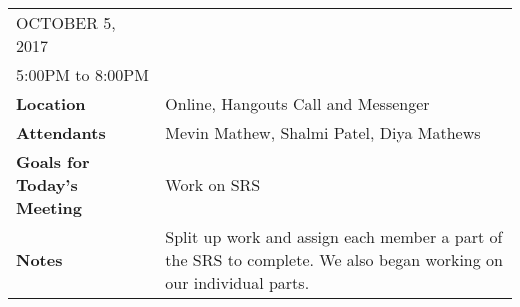 \documentclass{article}
\begin{document}
\begin{table}[hp]
\begin{tabularx}{\textwidth}{lX}
\toprule
OCTOBER 5, 2017\\
5:00PM to 8:00PM\\
\midrule
\textbf{Location} & Online, Hangouts Call and Messenger\\
\textbf{Attendants} & Mevin Mathew, Shalmi Patel, Diya Mathews\\
\midrule
\textbf{Goals for Today's Meeting} & Work on SRS\\
\midrule
\textbf{Notes} & Split up work and assign each member a part of the SRS to complete. We also began working on our individual parts.\\
\bottomrule
\end{tabularx}
\end{table}
\end{document}
